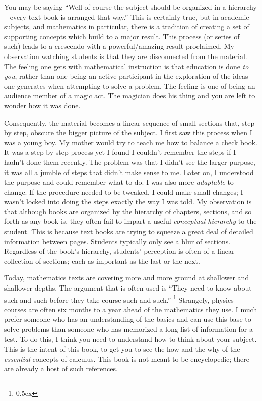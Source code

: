 You may be saying ``Well of course the subject should be organized in a
hierarchy -- every text book is arranged that way.'' This is certainly true,
but in academic subjects, and mathematics in particular, there is a tradition of
creating a set of supporting concepts which build to a major result. 
This process (or series of such) leads to a crescendo with a powerful/amazing result
proclaimed. My observation watching students is that they are disconnected from
the material. The feeling one gets with mathematical instruction is that 
education is done {\it to you\/}, rather than one being an active participant in 
the exploration of the ideas one generates when attempting to solve a problem.
The feeling is one of being an audience member of a magic act. The magician does his thing and you are left to wonder how it was done.

Consequently, the material becomes a linear sequence of 
small sections that, step by step, obscure the bigger picture of the subject. 
I first saw this process
when I was a young boy. My mother would try to teach me how to balance a check 
book. It was a step by step process yet I found I couldn't remember the steps
if I hadn't done them recently. The problem was that I didn't see the 
larger purpose, it was all a jumble of steps that didn't make sense to me. 
Later on, I understood the purpose and 
could remember what to do. I was also more {\it adaptable\/} to change.
If the procedure needed to be tweaked, I could make small changes; I wasn't 
locked into doing the steps exactly the way I was told. My observation is that 
although books are organized by the hierarchy of chapters, sections, and so 
forth as any book is, they often fail to impart a useful 
{\it conceptual hierarchy\/} to the student. This is because text 
books are trying to squeeze a great deal 
of detailed information between pages. Students typically only see a blur 
of sections. Regardless of the book's hierarchy,
students' perception is often of a linear collection of sections; each as
important as the last or the next.

Today, mathematics texts are covering 
more and more 
ground at shallower and shallower depths. The argument that is often used is 
``They need to know about such and such before they take course such 
and such.''%
\footnote{\kern 0.5pt \raise 0.5ex \hbox{\dag}}%
{Strangely, physics courses are often  
six months to a year ahead of the mathematics they use.} 
I much prefer someone who has an understanding of the basics and 
can use this base to solve problems than someone who has memorized a long 
list of information for a test. To do this, I think you need to understand 
how to think about your subject. This is the intent of this book, to get 
you to see the how and the why of the {\it essential\/} concepts 
of calculus. This book is not meant to be encyclopedic; there are already 
a host of such references.

